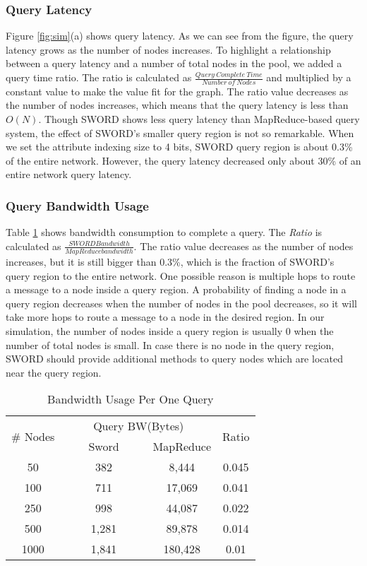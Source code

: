 \documentclass{acm_proc_article-sp}
\begin{document}
\subsubsection{Query Latency}
Figure \ref{fig:sim}(a) shows query latency. As we can see from the figure, the query latency grows as the number of nodes increases. To highlight a relationship between a query latency and a number of total nodes in the pool,
we added a query time ratio. The ratio is calculated as \begin{math}\frac{Query\ Complete\ Time}{Number\ of\ Nodes}\end{math} and multiplied by a constant value to make the value fit for the graph.
The ratio value decreases as the number of nodes increases, which means that the query latency is less than $O(N)$.
Though SWORD shows less query latency than MapReduce-based query system, the effect of SWORD's smaller query region is not so remarkable. 
When we set the attribute indexing size to 4 bits, SWORD query region is about 0.3\% of the entire network. 
However, the query latency decreased only about 30\% of an entire network query latency.
\subsubsection{Query Bandwidth Usage}
Table \ref{table:bw} shows bandwidth consumption to complete a query. The \textit{Ratio} is calculated as \begin{math}\frac{SWORD Bandwidth}{MapReduce bandwidth}\end{math}. The ratio value decreases as the number of nodes
increases, but it is still bigger than 0.3\%, which is the fraction of SWORD's query region to the entire network. One possible reason is multiple hops to route a message to a node inside a query region.
A probability of finding a node in a query region decreases when the number of nodes in the pool decreases, so it will take more hops to route a message to a node in the desired region. 
In our simulation, the number of nodes inside a query region is usually 0 when the number of total nodes is small. 
In case there is no node in the query region, SWORD should provide additional methods to query nodes which are located near the query region.
\begin{table}
\centering
\caption{\label{table:bw}Bandwidth Usage Per One Query}
\begin{center}
\begin{tabular}{|c|c|c|c|} \hline
\multirow{2}{*}{\# Nodes}&\multicolumn{2}{|c|}{Query BW(Bytes)}&\multirow{2}{*}{Ratio} \\ \cline{2-3}
\ &\ \ \ \ Sword\ \ \ \ &MapReduce& \\ \hline\hline
50&382&8,444&0.045\\ \hline
100&711&17,069&0.041\\ \hline
250&998&44,087&0.022\\ \hline
500&1,281&89,878&0.014\\ \hline
1000&1,841&180,428&0.01\\ \hline
\end{tabular}
\end{center}
\end{table}
\end{document}
